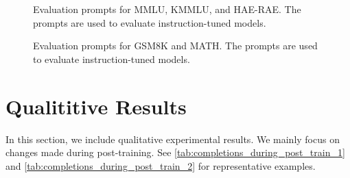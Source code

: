 \begin{figure}
    \caption{
    Evaluation prompts for MMLU, KMMLU, and HAE-RAE.
    The prompts are used to evaluate instruction-tuned models.
    }
    \label{fig:evaluation-prompts-general}
\end{figure}

\begin{figure}
    \centering
    
    
    \caption{
    Evaluation prompts for GSM8K and MATH.
    The prompts are used to evaluate instruction-tuned models.
    }
    \label{fig:evaluation-prompts-math}
\end{figure}


\section{Qualititive Results} \label{sec:qualititive_results}

In this section, we include qualitative experimental results.
We mainly focus on changes made during post-training.
See \autoref{tab:completions_during_post_train_1} and \autoref{tab:completions_during_post_train_2} for representative examples.

